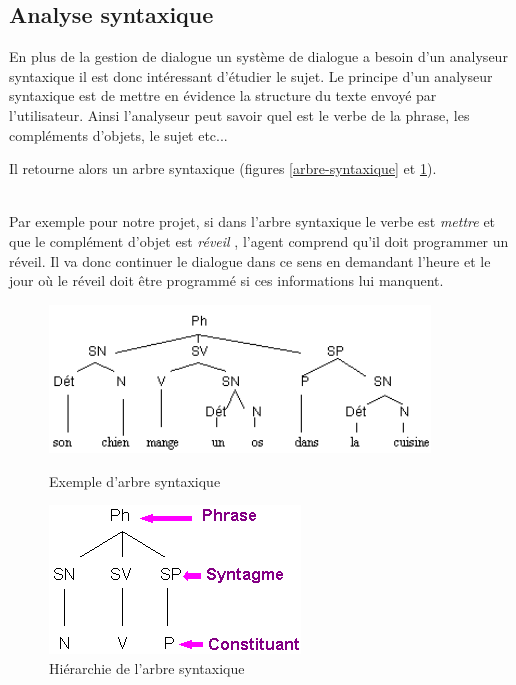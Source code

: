 \FloatBarrier
\subsection{Analyse syntaxique}
En plus de la gestion de dialogue un système de dialogue a besoin d'un analyseur syntaxique il est donc intéressant d'étudier le sujet. Le principe d'un analyseur syntaxique est de mettre en évidence la structure du texte envoyé par l'utilisateur. Ainsi l'analyseur peut savoir quel est le verbe de la phrase, les compléments d'objets, le sujet etc... 

Il retourne alors un arbre syntaxique (figures \ref{arbre-syntaxique} et \ref{arbre-syntaxique2}). 

~\\\indent Par exemple pour notre projet, si dans l'arbre syntaxique le verbe est \og \textit{mettre} \fg{} et que le complément d'objet est \og \textit{réveil} \fg, l'agent \og comprend \fg{} qu'il doit programmer un réveil. Il va donc continuer le dialogue dans ce sens en demandant l'heure et le jour où le réveil doit être programmé si ces informations lui manquent.

\begin{figure}[!h]
	\centering
	\begin{minipage}{.5\textwidth}
		\centering
		\includegraphics[width=0.9\textwidth]{images/arbre.png}
		\caption{Exemple d'arbre syntaxique}
		\label{arbre-syntaxique}
	\end{minipage}%
	\begin{minipage}{0.5\textwidth}
		\centering
		\includegraphics[width=0.9\linewidth]{images/arbre2.png}
		\caption{Hiérarchie de l'arbre syntaxique}
		\label{arbre-syntaxique2}
	\end{minipage}
\end{figure}

